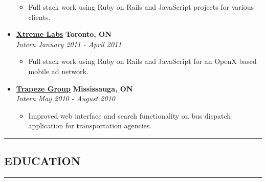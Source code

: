 \documentclass[10pt,letterpaper]{article}
\begin{document}
\begin{itemize}[leftmargin=*]
    \begin{itemize}[label=\textbullet]
      \itemsep0em
      \item Full stack work using Ruby on Rails and JavaScript projects for various
        clients.
    \end{itemize}

    \item[]
    {\href{http://www.xtremelabs.com/}{\textbf{Xtreme Labs}} \hfill
      \textbf{Toronto, ON}}
    \\
    {\emph{Intern} \hfill \emph{January 2011 - April 2011}}

    \begin{itemize}[label=\textbullet]
      \itemsep0em
      \item Full stack work using Ruby on Rails and JavaScript for an OpenX
        based mobile ad network.
    \end{itemize}

    \item[]
    {\href{http://www.trapezegroup.com/}{\textbf{Trapeze Group}} \hfill
      \textbf{Mississauga, ON}}
    \\
    {\emph{Intern} \hfill \emph{May 2010 - August 2010}}

    \begin{itemize}[label=\textbullet]
      \itemsep0em
      \item Improved web interface and search functionality on bus dispatch
        application for transportation agencies.
    \end{itemize}
  \end{itemize}



\hrule
\vspace{-1.0em}
\subsection*{EDUCATION}
\hrule
\vspace{0.6em}
\end{document}
